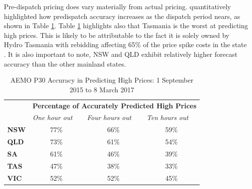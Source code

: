 Pre-dispatch pricing does vary materially from actual pricing. \textcite{AEMCMarch2017} quantitatively highlighted how predispatch accuracy increases as the dispatch period nears, as shown in Table \ref{table:prediction_aemc}. Table \ref{table:prediction_aemc} highlights also that Tasmania is the worst at predicting high prices. This is likely to be attributable to the fact it is solely owned by Hydro Tasmania with rebidding affecting 65\% of the price spike costs in the state \parencite{AEMCTas}. It is also important to note, NSW and QLD exhibit relatively higher forecast accuracy than the other mainland states.
\begin{centering}
\begin{table}[!h]
\begin{tabular}{l|c|c|c|}
\cline{2-4}
                                   & \multicolumn{3}{l|}{\cellcolor[HTML]{EFEFEF}\textbf{Percentage of Accurately Predicted High Prices}}                                    \\ \cline{2-4} 
                                   & \multicolumn{1}{l|}{\textit{One hour out}} & \multicolumn{1}{l|}{\textit{Four hours out}} & \multicolumn{1}{l|}{\textit{Ten hours out}} \\ \hline
\multicolumn{1}{|l|}{\textbf{NSW}} & 77\%                                       & 66\%                                         & 59\%                                        \\ \hline
\multicolumn{1}{|l|}{\textbf{QLD}} & 73\%                                       & 61\%                                         & 54\%                                        \\ \hline
\multicolumn{1}{|l|}{\textbf{SA}}  & 61\%                                       & 46\%                                         & 39\%                                        \\ \hline
\multicolumn{1}{|l|}{\textbf{TAS}} & 47\%                                       & 38\%                                         & 33\%                                        \\ \hline
\multicolumn{1}{|l|}{\textbf{VIC}} & 52\%                                       & 52\%                                         & 45\%                                         \\ \hline
\end{tabular}
\caption{AEMO P30 Accuracy in Predicting High Prices: 1 September 2015 to 8 March 2017}
\label{table:prediction_aemc}
\end{table}
\end{centering}
